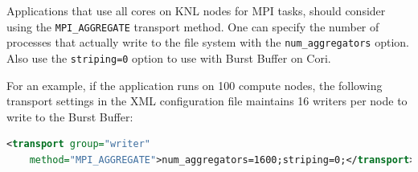 Applications that use all cores on KNL nodes for MPI tasks, should consider using the \verb+MPI_AGGREGATE+ transport method. One can specify the number of processes that actually write to the file system with the \verb+num_aggregators+ option. Also use the \verb+striping=0+ option to use with Burst Buffer on Cori. 

For an example, if the application runs on 100 compute nodes, the following transport settings in the XML configuration file maintains 16 writers per node to write to the Burst Buffer:
\begin{lstlisting}[language=XML]
<transport group="writer" 
	method="MPI_AGGREGATE">num_aggregators=1600;striping=0;</transport>
\end{lstlisting}



